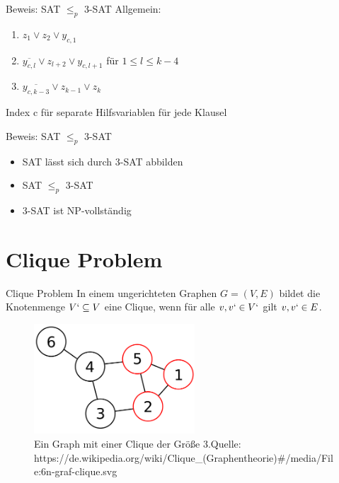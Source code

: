 \documentclass[12pt,donthandout,notes=dontshow,xcolor=table]{beamer}
\begin{document}
\begin{frame}{Beweis: SAT \(\leq_p\) 3-SAT}
Allgemein:
\begin{enumerate}
\item $z_1 \vee z_2 \vee y_{c,1}$
\item $\overline{y_{c,l}} \vee z_{l+2} \vee y_{c,l+1}$ für $1 \le l \le k - 4$
\item $\overline{y_{c,k-3}} \vee z_{k-1} \vee z_k$
\end{enumerate}
Index c für separate Hilfsvariablen für jede Klausel
\end{frame}

\begin{frame}{Beweis: SAT \(\leq_p\) 3-SAT}
\begin{itemize}
\item SAT lässt sich durch 3-SAT abbilden
\item SAT \(\leq_p\) 3-SAT
\item 3-SAT ist NP-vollständig
\end{itemize}
\end{frame}

\section{Clique Problem}
\begin{frame}{Clique Problem}
In einem ungerichteten Graphen $G = (V,E)$ bildet die Knotenmenge $V` \subseteq V$ eine Clique, wenn für alle $v, v` \in V`$ gilt ${v,v`} \in E$. \cite{wegener}
\pause
\begin{figure}
\includegraphics[width=6cm]{figures/clique1.png}
\caption{Ein Graph mit einer Clique der Größe 3.\newline \newline \tiny Quelle: https://de.wikipedia.org/wiki/Clique\_(Graphentheorie)\#/media/File:6n-graf-clique.svg}
\end{figure}
\end{frame}
\end{document}
